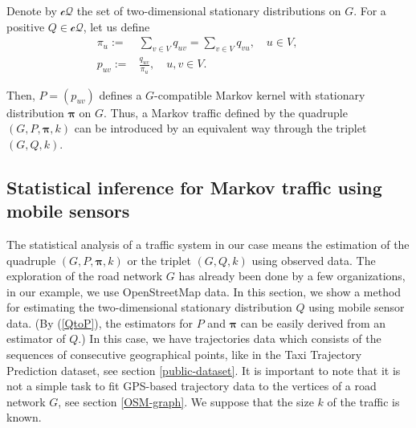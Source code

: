 \documentclass[b5paper,12pt]{report}
\theoremstyle{definition}
\newcommand{\bpi}{\boldsymbol{\pi}}
\begin{document}
Denote by $\mathcal{cQ}$ the set of two-dimensional stationary distributions on $G$. For a positive $Q\in\mathcal{cQ}$, let us define
\begin{equation}\label{QtoP}
\begin{aligned}
        \pi_u := &\sum_{v\in V} q_{uv} = \sum_{v\in V} q_{vu}, \quad u\in V, \qquad
        \\ p_{uv} := &\frac{q_{uv}}{\pi_u} ,\quad u,v\in V.
\end{aligned}
\end{equation} 

Then, $P=(p_{uv})$ defines a $G$-compatible Markov kernel with stationary distribution $\bpi$ on $G$. Thus, a Markov traffic defined by the quadruple $(G,P,\bpi,k)$ can be introduced by an equivalent way through the triplet $(G,Q,k)$.

\subsection{Statistical inference for Markov traffic using mobile sensors}
\label{inference}

The statistical analysis of a traffic system in our case means the estimation of the quadruple $(G,P,\bpi,k)$ or the triplet $(G,Q,k)$ using observed data. The exploration of the road network $G$ has already been done by a few organizations, in our example, we use OpenStreetMap data. In this section, we show a method for estimating the two-dimensional stationary distribution $Q$ using mobile sensor data. (By (\ref{QtoP}), the estimators for $P$ and $\bpi$ can be easily derived from an estimator of $Q$.) In this case, we have trajectories data which consists of the sequences of consecutive geographical points, like in the Taxi Trajectory Prediction dataset, see section \ref{public-dataset}. It is important to note that it is not a simple task to fit GPS-based trajectory data to the vertices of a road network $G$, see section \ref{OSM-graph}. We suppose that the size $k$ of the traffic is known.
\end{document}
